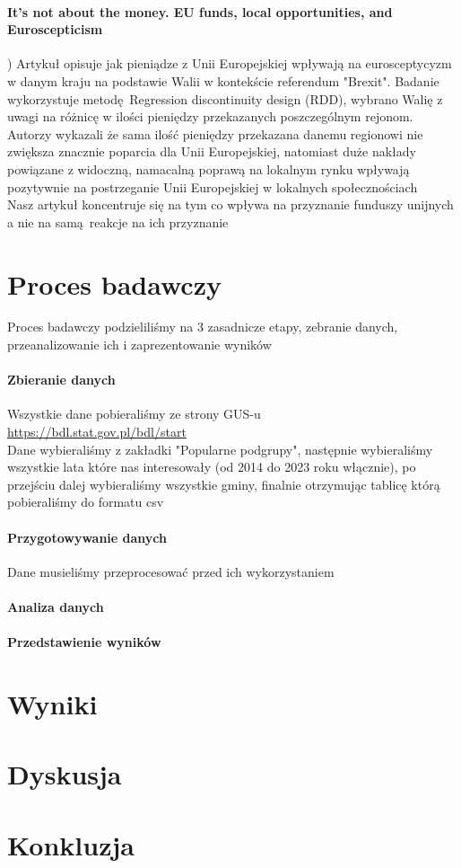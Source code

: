 \documentclass[12pt]{article}
\begin{document}
\paragraph{It’s not about the money. EU funds, local opportunities, and Euroscepticism})
Artykuł opisuje jak pieniądze z Unii Europejskiej wpływają na eurosceptycyzm w danym kraju na podstawie Walii w kontekście referendum "Brexit". 
Badanie wykorzystuje metodę Regression discontinuity design (RDD), wybrano Walię z uwagi na różnicę w ilości pieniędzy przekazanych poszczególnym rejonom. 
Autorzy wykazali że sama ilość pieniędzy przekazana danemu 
regionowi nie zwiększa znacznie poparcia dla 
Unii Europejskiej, natomiast duże nakłady powiązane z 
widoczną, namacalną poprawą na lokalnym rynku wpływają 
pozytywnie na postrzeganie Unii Europejskiej w lokalnych 
społecznościach \cite{6} \\ 
Nasz artykuł koncentruje się na tym co wpływa na przyznanie funduszy unijnych a nie na samą reakcje na ich przyznanie 
\section{Proces badawczy}
Proces badawczy podzieliliśmy na 3 zasadnicze etapy, zebranie danych, przeanalizowanie ich i zaprezentowanie wyników

\paragraph{Zbieranie danych}
Wszystkie dane pobieraliśmy ze strony GUS-u \\
\href{https://bdl.stat.gov.pl/bdl/start}{https://bdl.stat.gov.pl/bdl/start} \\ 
Dane wybieraliśmy z zakładki "Popularne podgrupy", następnie wybieraliśmy wszystkie lata które nas 
interesowały (od 2014 do 2023 roku włącznie), po przejściu dalej wybieraliśmy wszystkie gminy, 
finalnie otrzymując tablicę którą pobieraliśmy do formatu csv \\ 
\paragraph{Przygotowywanie danych}
Dane musieliśmy przeprocesować przed ich wykorzystaniem 
\paragraph{Analiza danych}
\paragraph{Przedstawienie wyników}

\section{Wyniki}


\section{Dyskusja}


\section{Konkluzja}




\end{document}
